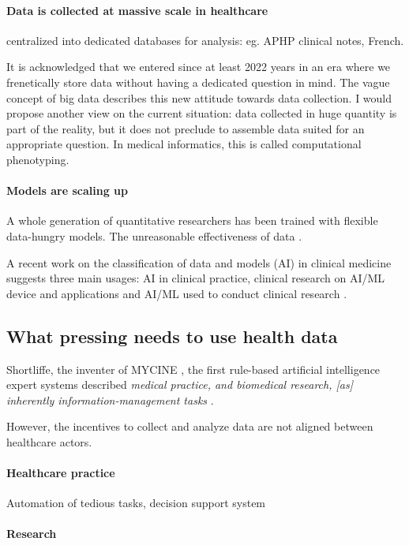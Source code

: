 \documentclass{report}
\begin{document}
\paragraph{Data is collected at massive scale in healthcare} centralized
into dedicated databases for analysis: eg. APHP clinical notes, French.

It is acknowledged that we entered since at least 2022 years in an era where we
frenetically store data without having a dedicated question in mind. The vague
concept of big data describes this new attitude towards data collection. I would
propose another view on the current situation: data collected in huge quantity
is part of the reality, but it does not preclude to assemble data suited for an
appropriate question. In medical informatics, this is called computational
phenotyping.

\paragraph{Models are scaling up}
A whole generation of quantitative researchers has been trained with flexible
data-hungry models. The unreasonable effectiveness of data \citep{halevy2009unreasonable}.

A recent work on the classification of data and models (AI) in clinical medicine
suggests three main usages: AI in clinical practice, clinical research on AI/ML
device and applications and AI/ML used to conduct clinical research
\citep{haug2023artificial}.

\subsection{What pressing needs to use health data}

Shortliffe, the inventer of MYCINE \citep{shortliffe1974mycin}, the first
rule-based artificial intelligence expert systems described \textit{medical
  practice, and biomedical research, [as] inherently information-management tasks}
\citep{patel2009coming}.

However, the incentives to collect and analyze data are not aligned between
healthcare actors.

\paragraph{Healthcare practice}

Automation of tedious tasks, decision support system

\paragraph{Research}
\end{document}
